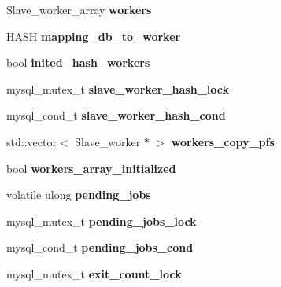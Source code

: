 \begin{DoxyCompactItemize}
Slave\+\_\+worker\+\_\+array {\bfseries workers}
\item 
\mbox{\label{classRelay__log__info_a8d4f146fb99a6061b77c1e11bc1bad59}} 
H\+A\+SH {\bfseries mapping\+\_\+db\+\_\+to\+\_\+worker}
\item 
\mbox{\label{classRelay__log__info_a2d1a2186486bb188c869ac2ee62bfc6b}} 
bool {\bfseries inited\+\_\+hash\+\_\+workers}
\item 
\mbox{\label{classRelay__log__info_a54e97ea210c1eebda090b14ad21e76ef}} 
mysql\+\_\+mutex\+\_\+t {\bfseries slave\+\_\+worker\+\_\+hash\+\_\+lock}
\item 
\mbox{\label{classRelay__log__info_af5a9fc7cface91d34f721ad0a680646a}} 
mysql\+\_\+cond\+\_\+t {\bfseries slave\+\_\+worker\+\_\+hash\+\_\+cond}
\item 
\mbox{\label{classRelay__log__info_a73402a9624bcf4a20b93878f5ccac479}} 
std\+::vector$<$ Slave\+\_\+worker $\ast$ $>$ {\bfseries workers\+\_\+copy\+\_\+pfs}
\item 
\mbox{\label{classRelay__log__info_a71b987189f94882b9c287f5df3329d43}} 
bool {\bfseries workers\+\_\+array\+\_\+initialized}
\item 
\mbox{\label{classRelay__log__info_a1ba08799477aab79a09dec7e9d9f2f66}} 
volatile ulong {\bfseries pending\+\_\+jobs}
\item 
\mbox{\label{classRelay__log__info_a2c39c01240d28e03760b9cc50ad3cf5f}} 
mysql\+\_\+mutex\+\_\+t {\bfseries pending\+\_\+jobs\+\_\+lock}
\item 
\mbox{\label{classRelay__log__info_a4e67525d3c6c2f5fb369601e25e9c6ec}} 
mysql\+\_\+cond\+\_\+t {\bfseries pending\+\_\+jobs\+\_\+cond}
\item 
\mbox{\label{classRelay__log__info_acbf96584fe2d6bb130e76953041d24e3}} 
mysql\+\_\+mutex\+\_\+t {\bfseries exit\+\_\+count\+\_\+lock}
\item 
\mbox{\label{classRelay__log__info_a23ee3506dd58a3812d0601ff83680567}} 

\end{DoxyCompactItemize}
